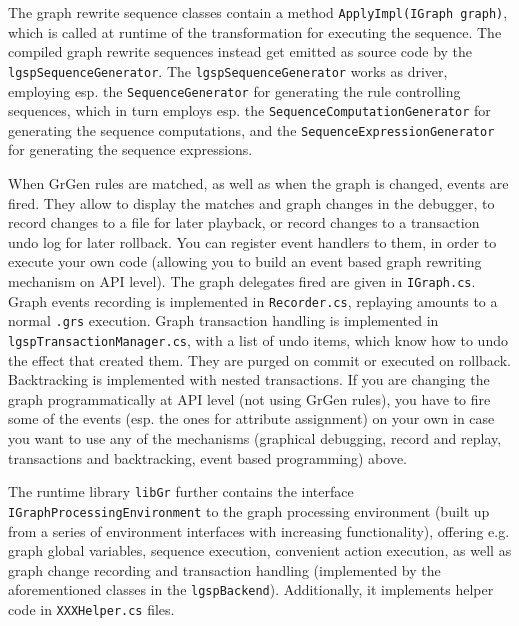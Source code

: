 The graph rewrite sequence classes contain a method \texttt{ApplyImpl(IGraph graph)}, which is called at runtime of the transformation for executing the sequence.
The compiled graph rewrite sequences instead get emitted as source code by the \texttt{lgsp\-Sequence\-Generator}.
The \texttt{lgsp\-Sequence\-Generator} works as driver, employing esp. the \texttt{Sequence\-Generator} for generating the rule controlling sequences, which in turn employs esp. the \texttt{Sequence\-Computation\-Generator} for generating the sequence computations, and the \texttt{Sequence\-Expression\-Generator} for generating the sequence expressions.

When GrGen rules are matched, as well as when the graph is changed, events are fired.
They allow to display the matches and graph changes in the debugger,
to record changes to a file for later playback, or record changes to a transaction undo log for later rollback.
You can register event handlers to them, in order to execute your own code (allowing you to build an event based graph rewriting mechanism on API level).
The graph delegates fired are given in \texttt{IGraph.cs}.
Graph events recording is implemented in \texttt{Recorder.cs}, replaying amounts to a normal \texttt{.grs} execution.
Graph transaction handling is implemented in \texttt{lgspTransactionManager.cs}, with a list of undo items, which know how to undo the effect that created them.
They are purged on commit or executed on rollback.
Backtracking is implemented with nested transactions.
If you are changing the graph programmatically at API level (not using GrGen rules), you have to fire some of the events (esp. the ones for attribute assignment) on your own in case you want to use any of the mechanisms (graphical debugging, record and replay, transactions and backtracking, event based programming) above.

The runtime library \texttt{libGr} further contains the interface \texttt{IGraphProcessingEnvironment} to the graph processing environment (built up from a series of environment interfaces with increasing functionality), offering e.g. graph global variables, sequence execution, convenient action execution, as well as graph change recording and transaction handling (implemented by the aforementioned classes in the \texttt{lgspBackend}).
Additionally, it implements helper code in \texttt{XXXHelper.cs} files.

